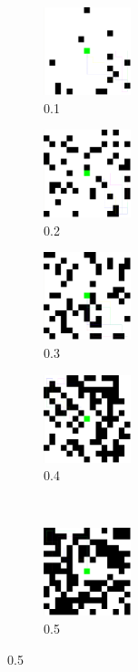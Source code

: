 \documentclass{article}
\begin{document}
\begin{figure}
	\centering
	\begin{subfigure}[b]{0.2\linewidth}
		\includegraphics[width=1in]{./figures/randommap01}
		\caption{0.1}
	\end{subfigure}
	\begin{subfigure}[b]{0.2\linewidth}
		\includegraphics[width=1in]{./figures/randommap02}
		\caption{0.2}
	\end{subfigure}
	\begin{subfigure}[b]{0.2\linewidth}
		\includegraphics[width=1in]{./figures/randommap03}
		\caption{0.3}
	\end{subfigure}
	\begin{subfigure}[b]{0.2\linewidth}
		\includegraphics[width=1in]{./figures/randommap04}
		\caption{0.4}
	\end{subfigure}\\
	\begin{subfigure}[b]{0.2\linewidth}
		\includegraphics[width=1in]{./figures/randommap05}
		\caption{0.5}
	\end{subfigure}

\end{figure}
\end{document}
